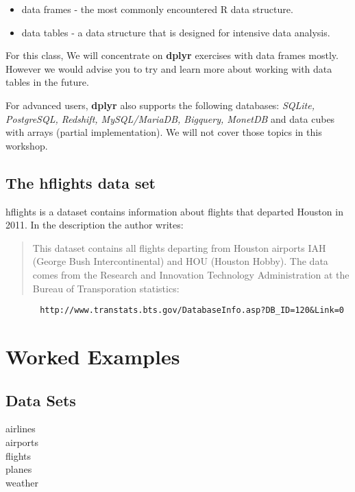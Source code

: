 \documentclass{article}
\begin{document}
\begin{itemize}
\item data frames - the  most commonly encountered R data structure. 
\item data tables - a data structure that is designed for intensive data analysis.
\end{itemize}

\noindent For this class, We will concentrate on \textbf{dplyr} exercises with data frames mostly. However we would advise you to try and learn more about working with data tables in the future.\\
\bigskip

\noindent For advanced users, \textbf{dplyr} also supports the following databases: \textit{SQLite, PostgreSQL, Redshift, MySQL/MariaDB, Bigquery, MonetDB} and data cubes with arrays (partial implementation). We will not cover those topics in this workshop.

\subsection*{The hflights data set}
hflights is a dataset contains information about flights that departed Houston in 2011. In the description the author writes:
\begin{quote}
This dataset contains all flights departing from Houston airports IAH (George Bush Intercontinental) and HOU (Houston Hobby). The data comes from the Research and Innovation Technology Administration at the Bureau of Transporation statistics:
\end{quote}
\begin{verbatim}
       http://www.transtats.bts.gov/DatabaseInfo.asp?DB_ID=120&Link=0
\end{verbatim}
\newpage
\section{Worked Examples}

\subsection{Data Sets}
\begin{description}
\item[airlines]
\item[airports]
\item[flights]
\item[planes] 
\item[weather]
\end{description}
\end{document}
